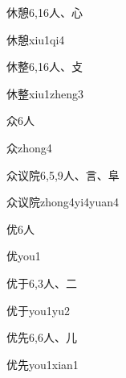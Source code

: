 \begin{entry}{休憩}{6,16}{⼈、⼼}
  \begin{phonetics}{休憩}{xiu1qi4}
  \end{phonetics}
\end{entry}

\begin{entry}{休整}{6,16}{⼈、⽁}
  \begin{phonetics}{休整}{xiu1zheng3}
  \end{phonetics}
\end{entry}

\begin{entry}{众}{6}{⼈}
  \begin{phonetics}{众}{zhong4}
  \end{phonetics}
\end{entry}

\begin{entry}{众议院}{6,5,9}{⼈、⾔、⾩}
  \begin{phonetics}{众议院}{zhong4yi4yuan4}
  \end{phonetics}
\end{entry}

\begin{entry}{优}{6}{⼈}
  \begin{phonetics}{优}{you1}
  \end{phonetics}
\end{entry}

\begin{entry}{优于}{6,3}{⼈、⼆}
  \begin{phonetics}{优于}{you1yu2}
  \end{phonetics}
\end{entry}

\begin{entry}{优先}{6,6}{⼈、⼉}
  \begin{phonetics}{优先}{you1xian1}
  \end{phonetics}
\end{entry}

